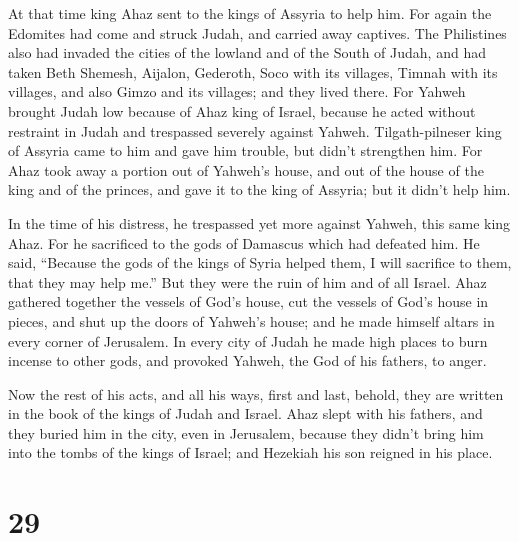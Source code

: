  At that time king Ahaz sent to the kings of Assyria to
help him.  For again the Edomites had come and struck
Judah, and carried away captives.  The Philistines also had
invaded the cities of the lowland and of the South of Judah, and had
taken Beth Shemesh, Aijalon, Gederoth, Soco with its villages, Timnah
with its villages, and also Gimzo and its villages; and they lived
there.  For Yahweh brought Judah low because of Ahaz king
of Israel, because he acted without restraint in Judah and trespassed
severely against Yahweh.  Tilgath-pilneser king of Assyria
came to him and gave him trouble, but didn't strengthen him.
 For Ahaz took away a portion out of Yahweh's house, and
out of the house of the king and of the princes, and gave it to the king
of Assyria; but it didn't help him.

 In the time of his distress, he trespassed yet more
against Yahweh, this same king Ahaz.  For he sacrificed to
the gods of Damascus which had defeated him. He said, ``Because the gods
of the kings of Syria helped them, I will sacrifice to them, that they
may help me.'' But they were the ruin of him and of all Israel.
 Ahaz gathered together the vessels of God's house, cut the
vessels of God's house in pieces, and shut up the doors of Yahweh's
house; and he made himself altars in every corner of Jerusalem.
 In every city of Judah he made high places to burn incense
to other gods, and provoked Yahweh, the God of his fathers, to anger.

 Now the rest of his acts, and all his ways, first and
last, behold, they are written in the book of the kings of Judah and
Israel.  Ahaz slept with his fathers, and they buried him
in the city, even in Jerusalem, because they didn't bring him into the
tombs of the kings of Israel; and Hezekiah his son reigned in his place.

\hypertarget{section-28}{%
\section{29}\label{section-28}}

